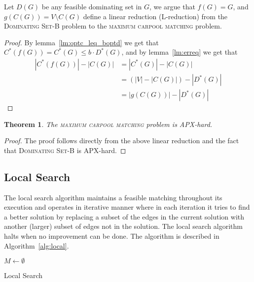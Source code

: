 \documentclass[draft]{article}
\def\CARPOOL{maximum carpool matching}
\def\N{\mathbb{N}}
\newtheorem{theorem}{Theorem}
\begin{document}
Let $D(G)$ be any feasible dominating set in $G$, 
we argue that $f(G) = G$, and $g(C(G)) = V \setminus C(G)$ 
define a linear reduction (L-reduction) from the \textsc{Dominating Set-B} problem to the 
\textsc{\CARPOOL{}} problem.
\begin{proof}
By lemma~\ref{lm:optc_leq_boptd} we get that $C^*(f(G)) = C^*(G) \leq b \cdot D^*(G)$,
and by lemma~\ref{lm:erreq} we get that 
\begin{equation}
\begin{split}
|C^*(f(G))| - |C(G)|		& = |C^*(G)| - |C(G)| 			\\
							& = (|V| - |C(G)|) - |D^*(G)|	\\
							& = |g(C(G))| - |D^*(G)|
\end{split}
\end{equation}
\end{proof}

\begin{theorem}
The \textsc{\CARPOOL{}} problem is APX-hard.
\end{theorem}

\begin{proof}
The proof follows directly from the above linear reduction and the fact that 
\textsc{Dominating Set-B} is APX-hard. 
\end{proof}

	\subsection{Local Search}
	\label{sec:local}
The local search algorithm maintains a feasible matching throughout its execution
and operates in 
iterative manner where in each iteration it tries to find a better solution by
replacing a subset of the edges in the current solution with 
another (larger) subset of edges not in the solution.
The local search algorithm halts when no improvement can be done.
The algorithm is described in Algorithm~\ref{alg:local}. 

\begin{algorithm}
\KwIn{$G = (V, A)$, $c : V \rightarrow \N$, $k$}
$M \leftarrow \emptyset$								\\

\caption{
\label{alg:local}
Local Search}
\end{algorithm}
\end{document}
